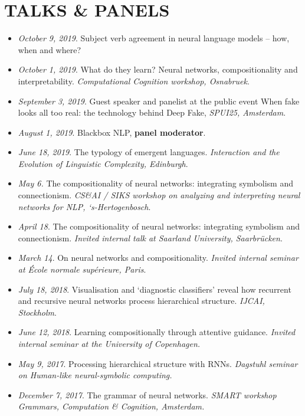 \section{TALKS \& PANELS}

\begin{itemize}
\setlength\itemsep{5pt}
    \item \textit{October 9, 2019}. Subject verb agreement in neural language models -- how, when and where?
    \item \textit{October 1, 2019}. What do they learn? Neural networks, compositionality and interpretability. \textit{Computational Cognition workshop, Osnabruek}.
    \item \textit{September 3, 2019}. Guest speaker and panelist at the public event When fake looks all too real: the technology behind Deep Fake, \textit{SPUI25, Amsterdam}.
    \item \textit{August 1, 2019}. Blackbox NLP, \textbf{panel moderator}.
    \item \textit{June 18, 2019}. The typology of emergent languages. \textit{Interaction and the Evolution of Linguistic Complexity, Edinburgh}.
    \item \textit{May 6.} The compositionality of neural networks: integrating symbolism and connectionism. \textit{CS\&AI / SIKS workshop on analyzing and interpreting neural networks for NLP, ‘s-Hertogenbosch}.
    \item \textit{April 18}. The compositionality of neural networks: integrating symbolism and connectionism. \textit{Invited internal talk at Saarland University, Saarbrücken}.
    \item \textit{March 14}. On neural networks and compositionality. \textit{Invited internal seminar at École normale supérieure, Paris}.
    \item \textit{July 18, 2018}. Visualisation and ‘diagnostic classifiers’ reveal how recurrent and recursive neural networks process hierarchical structure. \textit{IJCAI, Stockholm}.
    \item \textit{June 12, 2018}. Learning compositionally through attentive guidance. \textit{Invited internal seminar at the University of Copenhagen.}
    \item \textit{May 9, 2017}. Processing hierarchical structure with RNNs.\textit{ Dagstuhl seminar on Human-like neural-symbolic computing.}
    \item \textit{December 7, 2017}. The grammar of neural networks. \textit{SMART workshop Grammars, Computation \& Cognition, Amsterdam.}

\end{itemize}
